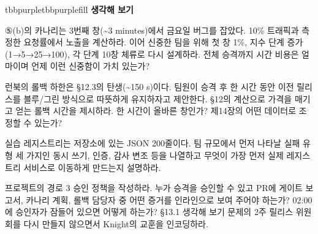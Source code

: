 \begin{calloutbox}{tbbpurple}{tbbpurplefill}
{\normalsize\bfseries\color{tbbpurple}생각해 보기}\par\vspace{3pt}
\begin{tbbitemize}
  \item ⑤(b)의 카나리는 3번째 창(\textasciitilde{}3 minutes)에서 금요일 버그를 잡았다. 10\% 트래픽과 측정한 요청률에서 노출을 계산하라. 이어 신중한 팀을 위해 첫 창 1\%, 지수 단계 증가(1→5→25→100), 각 단계 10창 체류로 다시 설계하라. 전체 승격까지 시간 비용은 얼마이며 언제 이런 신중함이 가치 있는가?
  \item 런북의 롤백 하한은 §12.3의 탄생(\textasciitilde{}150 s)이다. 팀원이 승격 후 한 시간 동안 이전 릴리스를 블루/그린 방식으로 따뜻하게 유지하자고 제안한다. §12의 계산으로 가격을 매기고 얻는 롤백 시간을 제시하라. 한 시간이 올바른 창인가? 제14장의 어떤 데이터로 조정할 수 있는가?
  \item 실습 레지스트리는 저장소에 있는 JSON 200줄이다. 팀 규모에서 먼저 나타날 실패 유형 세 가지인 동시 쓰기, 인증, 감사 변조 등을 나열하고 무엇이 가장 먼저 실제 레지스트리 서비스로 이동하게 만드는지 설명하라.
  \item 프로젝트의 경로 3 승인 정책을 작성하라. 누가 승격을 승인할 수 있고 PR에 게이트 보고서, 카나리 계획, 롤백 담당자 중 어떤 증거를 인라인으로 보여 주어야 하는가? 02:00에 승인자가 잠들어 있으면 어떻게 하는가? §13.1 생각해 보기 문제의 2주 릴리스 위원회를 다시 만들지 않으면서 Knight의 교훈을 인코딩하라.
\end{tbbitemize}
\end{calloutbox}





